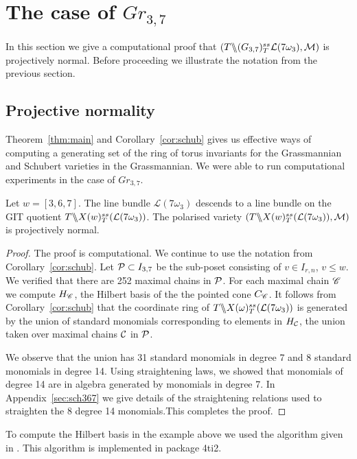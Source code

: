 \section{The case of $Gr_{3,7}$}
\label{sec:g37}
In this section we give a computational proof that $(T \backslash\mkern-6mu\backslash (G_{{3},{7}})^{ss}_T{\cal L}(7\omega_3),{\cal M})$ is projectively normal. Before proceeding we illustrate the notation from the previous section.


\subsection{Projective normality}
Theorem~\ref{thm:main} and Corollary~\ref{cor:schub} gives us effective ways of computing a generating set of the ring of torus invariants for the Grassmannian and Schubert varieties in the Grassmannian. We were able to run computational experiments in the case of $Gr_{3,7}$.

 \begin{theorem}
 \label{thm:w}
 Let  $w = [3,6,7].$  The line bundle \({\mathcal L}(7\omega_3)\) descends to a line bundle on the GIT quotient \(T \backslash\mkern-6mu\backslash X(w)^{ss}_T({\cal L}(7\omega_3))\). The polarised variety \((T \backslash\mkern-6mu\backslash X(w)^{ss}_T({\cal L}(7\omega_3)),{\cal M})\) is projectively normal.
\end{theorem}
\begin{proof}
The proof is computational. We continue to use the notation from Corollary~\ref{cor:schub}.   Let \({\cal P} \subset I_{3,7}\) be the sub-poset consisting of $v \in I_{r,n}$, $v \leq w$. We verified that there are 252 maximal chains in \({\cal P}\). For each maximal chain $\mathscr{C}$ we compute $H_{\mathscr{C}}$, the Hilbert basis of the the pointed cone \(C_{\mathscr{C}}\). It follows from Corollary~\ref{cor:schub} that the coordinate ring of \(T \backslash\mkern-6mu\backslash X(\omega)^{ss}_T({\cal L}(7\omega_3))\) is generated by the union of standard monomials corresponding to elements in $H_{\cal C}$, the union taken over maximal chains  ${\cal C}$ in ${\cal P}$.
    
We observe that the union has 31 standard monomials in degree 7 and 8 standard monomials in degree 14. Using straightening laws, we showed that monomials of degree 14 are in algebra generated by monomials in degree 7.  In Appendix~\ref{sec:sch367} we give details of the straightening relations used to straighten the 8 degree 14 monomials.This completes the proof. 
\end{proof}

To compute the Hilbert basis in the example above we used the algorithm given in \cite{hemmecke2002computation}. This algorithm is implemented in package 4ti2. 

